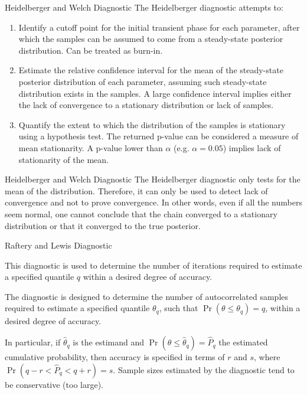 \begin{frame}{Heidelberger and Welch Diagnostic}
    The Heidelberger diagnostic attempts to:
        \begin{enumerate}
            \item Identify a cutoff point for the initial transient phase for each parameter, after which the samples can be assumed to come from a steady-state posterior distribution. Can be treated as burn-in.
            \item Estimate the relative confidence interval for the mean of the steady-state posterior distribution of each parameter, assuming such steady-state distribution exists in the samples. A large confidence interval implies either the lack of convergence to a stationary distribution or lack of samples.
            \item Quantify the extent to which the distribution of the samples is stationary using a hypothesis test. The returned p-value can be considered a measure of mean stationarity. A p-value lower than $\alpha$ (e.g. $\alpha = 0.05$) implies lack of stationarity of the mean.
        \end{enumerate}
\end{frame}

\begin{frame}{Heidelberger and Welch Diagnostic}
    The Heidelberger diagnostic only tests for the mean of the distribution. Therefore, it can only be used to detect lack of convergence and not to prove convergence. In other words, even if all the numbers seem normal, one cannot conclude that the chain converged to a stationary distribution or that it converged to the true posterior.
\end{frame}

\begin{frame}{Raftery and Lewis Diagnostic}
    \begin{vfilleditems}
        \item This diagnostic is used to determine the number of iterations required to estimate a specified quantile $q$ within a desired degree of accuracy.
        \item The diagnostic is designed to determine the number of autocorrelated samples required to estimate a specified quantile $\theta_q$, such that $\Pr(\theta \le \theta_q) = q$, within a desired degree of accuracy.
        \item In particular, if $\hat{\theta}_q$ is the estimand and $\Pr(\theta \le \hat{\theta}_q) = \hat{P}_q$ the estimated cumulative probability, then accuracy is specified in terms of $r$ and $s$, where $\Pr(q - r < \hat{P}_q < q + r) = s$. Sample sizes estimated by the diagnostic tend to be conservative (too large).
    \end{vfilleditems}
\end{frame}

